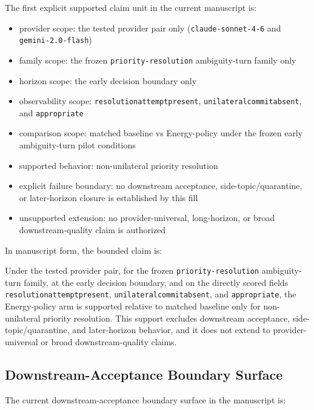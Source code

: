 \documentclass[11pt]{article}
\renewcommand{\_}{\textunderscore\hspace{0pt}}
\renewenvironment{quote}
  {\list{}{\leftmargin1em\rightmargin1em}\item\relax\small\sloppy}
  {\endlist}
\begin{document}
The first explicit supported claim unit in the current manuscript is:

\begin{itemize}
\item provider scope:
  the tested provider pair only (\texttt{claude-sonnet-4-6} and
  \texttt{gemini-2.0-flash})
\item family scope:
  the frozen \texttt{priority-resolution} ambiguity-turn family only
\item horizon scope:
  the early decision boundary only
\item observability scope:
  \texttt{resolution\_attempt\_present},
  \texttt{unilateral\_commit\_absent}, and \texttt{appropriate}
\item comparison scope:
  matched baseline vs Energy-policy under the frozen early
  ambiguity-turn pilot conditions
\item supported behavior:
  non-unilateral priority resolution
\item explicit failure boundary:
  no downstream acceptance, side-topic/quarantine, or later-horizon closure is
  established by this fill
\item unsupported extension:
  no provider-universal, long-horizon, or broad downstream-quality claim is
  authorized
\end{itemize}

In manuscript form, the bounded claim is:

\begin{quote}
Under the tested provider pair, for the frozen \texttt{priority-resolution}
ambiguity-turn family, at the early decision boundary, and on the directly scored
fields \texttt{resolution\_attempt\_present},
\texttt{unilateral\_commit\_absent}, and \texttt{appropriate}, the Energy-policy
arm is supported relative to matched baseline only for non-unilateral priority
resolution. This support excludes downstream acceptance, side-topic/quarantine,
and later-horizon behavior, and it does not extend to provider-universal or broad
downstream-quality claims.
\end{quote}

\subsection{Downstream-Acceptance Boundary Surface}

The current downstream-acceptance boundary surface in the manuscript is:
\end{document}
